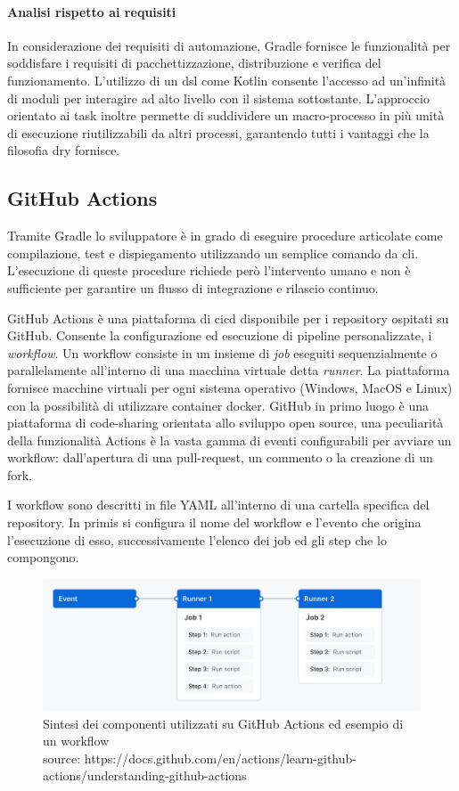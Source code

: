 \paragraph{Analisi rispetto ai requisiti}
In considerazione dei requisiti di automazione, Gradle fornisce le funzionalità per soddisfare i requisiti di pacchettizzazione, distribuzione e verifica del funzionamento. L'utilizzo di un \ac{dsl} come Kotlin consente l'accesso ad un'infinità di moduli per interagire ad alto livello con il sistema sottostante. L'approccio orientato ai task inoltre permette di suddividere un macro-processo in più unità di esecuzione riutilizzabili da altri processi, garantendo tutti i vantaggi che la filosofia \ac{dry} fornisce.

\subsection{GitHub Actions}

Tramite Gradle lo sviluppatore è in grado di eseguire procedure articolate come compilazione, test e dispiegamento utilizzando un semplice comando da \ac{cli}. L'esecuzione di queste procedure richiede però l'intervento umano e non è sufficiente per garantire un flusso di integrazione e rilascio continuo. 

GitHub Actions è una piattaforma di \ac{cicd} disponibile per i repository ospitati su GitHub. Consente la configurazione ed esecuzione di pipeline personalizzate, i \textit{workflow}. Un workflow consiste in un insieme di \textit{job} eseguiti sequenzialmente o parallelamente all'interno di una macchina virtuale detta \textit{runner}. La piattaforma fornisce macchine virtuali per ogni sistema operativo (Windows, MacOS e Linux) con la possibilità di utilizzare container docker. GitHub in primo luogo è una piattaforma di code-sharing orientata allo sviluppo open source, una peculiarità della funzionalità Actions è la vasta gamma di eventi configurabili per avviare un workflow: dall'apertura di una pull-request, un commento o la creazione di un fork.

I workflow sono descritti in file YAML all'interno di una cartella specifica del repository. In primis si configura il nome del workflow e l'evento che origina l'esecuzione di esso, successivamente l'elenco dei job ed gli step che lo compongono. 

\begin{figure}[H]
	\centering
	\includegraphics[width=.9\linewidth]{figures/overview-actions-simple.png}
	\caption{Sintesi dei componenti utilizzati su GitHub Actions ed esempio di un workflow \\ source: https://docs.github.com/en/actions/learn-github-actions/understanding-github-actions}
	\label{fig:github-actions-example}
\end{figure}

